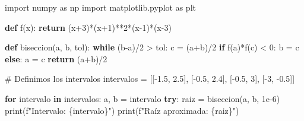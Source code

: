 \documentclass[
  letterpaper,
  DIV=11,
  numbers=noendperiod]{scrartcl}
\newenvironment{Shaded}{\begin{snugshade}}{\end{snugshade}}
\newcommand{\BuiltInTok}[1]{\textcolor[rgb]{0.00,0.23,0.31}{#1}}
\newcommand{\CommentTok}[1]{\textcolor[rgb]{0.37,0.37,0.37}{#1}}
\newcommand{\ControlFlowTok}[1]{\textcolor[rgb]{0.00,0.23,0.31}{\textbf{#1}}}
\newcommand{\DecValTok}[1]{\textcolor[rgb]{0.68,0.00,0.00}{#1}}
\newcommand{\FloatTok}[1]{\textcolor[rgb]{0.68,0.00,0.00}{#1}}
\newcommand{\ImportTok}[1]{\textcolor[rgb]{0.00,0.46,0.62}{#1}}
\newcommand{\KeywordTok}[1]{\textcolor[rgb]{0.00,0.23,0.31}{\textbf{#1}}}
\newcommand{\NormalTok}[1]{\textcolor[rgb]{0.00,0.23,0.31}{#1}}
\newcommand{\OperatorTok}[1]{\textcolor[rgb]{0.37,0.37,0.37}{#1}}
\newcommand{\SpecialCharTok}[1]{\textcolor[rgb]{0.37,0.37,0.37}{#1}}
\newcommand{\SpecialStringTok}[1]{\textcolor[rgb]{0.13,0.47,0.30}{#1}}
\begin{document}
\begin{Shaded}
\begin{Highlighting}[]
\ImportTok{import}\NormalTok{ numpy }\ImportTok{as}\NormalTok{ np}
\ImportTok{import}\NormalTok{ matplotlib.pyplot }\ImportTok{as}\NormalTok{ plt}

\KeywordTok{def}\NormalTok{ f(x):}
    \ControlFlowTok{return}\NormalTok{ (x}\OperatorTok{+}\DecValTok{3}\NormalTok{)}\OperatorTok{*}\NormalTok{(x}\OperatorTok{+}\DecValTok{1}\NormalTok{)}\OperatorTok{**}\DecValTok{2}\OperatorTok{*}\NormalTok{(x}\OperatorTok{{-}}\DecValTok{1}\NormalTok{)}\OperatorTok{*}\NormalTok{(x}\OperatorTok{{-}}\DecValTok{3}\NormalTok{)}

\KeywordTok{def}\NormalTok{ biseccion(a, b, tol):}
    \ControlFlowTok{while}\NormalTok{ (b}\OperatorTok{{-}}\NormalTok{a)}\OperatorTok{/}\DecValTok{2} \OperatorTok{\textgreater{}}\NormalTok{ tol:}
\NormalTok{        c }\OperatorTok{=}\NormalTok{ (a}\OperatorTok{+}\NormalTok{b)}\OperatorTok{/}\DecValTok{2}
        \ControlFlowTok{if}\NormalTok{ f(a)}\OperatorTok{*}\NormalTok{f(c) }\OperatorTok{\textless{}} \DecValTok{0}\NormalTok{:}
\NormalTok{            b }\OperatorTok{=}\NormalTok{ c}
        \ControlFlowTok{else}\NormalTok{:}
\NormalTok{            a }\OperatorTok{=}\NormalTok{ c}
    \ControlFlowTok{return}\NormalTok{ (a}\OperatorTok{+}\NormalTok{b)}\OperatorTok{/}\DecValTok{2}

\CommentTok{\# Definimos los intervalos}
\NormalTok{intervalos }\OperatorTok{=}\NormalTok{ [[}\OperatorTok{{-}}\FloatTok{1.5}\NormalTok{, }\FloatTok{2.5}\NormalTok{], [}\OperatorTok{{-}}\FloatTok{0.5}\NormalTok{, }\FloatTok{2.4}\NormalTok{], [}\OperatorTok{{-}}\FloatTok{0.5}\NormalTok{, }\DecValTok{3}\NormalTok{], [}\OperatorTok{{-}}\DecValTok{3}\NormalTok{, }\OperatorTok{{-}}\FloatTok{0.5}\NormalTok{]]}

\ControlFlowTok{for}\NormalTok{ intervalo }\KeywordTok{in}\NormalTok{ intervalos:}
\NormalTok{    a, b }\OperatorTok{=}\NormalTok{ intervalo}
    \ControlFlowTok{try}\NormalTok{:}
\NormalTok{        raiz }\OperatorTok{=}\NormalTok{ biseccion(a, b, }\FloatTok{1e{-}6}\NormalTok{)}
        \BuiltInTok{print}\NormalTok{(}\SpecialStringTok{f"Intervalo: }\SpecialCharTok{\{}\NormalTok{intervalo}\SpecialCharTok{\}}\SpecialStringTok{"}\NormalTok{)}
        \BuiltInTok{print}\NormalTok{(}\SpecialStringTok{f"Raíz aproximada: }\SpecialCharTok{\{}\NormalTok{raiz}\SpecialCharTok{\}}\SpecialStringTok{"}\NormalTok{)}
        

\end{Highlighting}
\end{Shaded}
\end{document}
